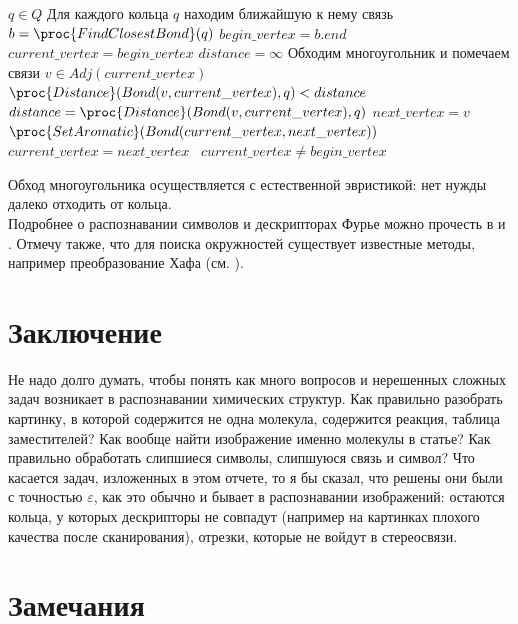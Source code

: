\begin{codebox}
  \li \For $q \in Q$
  \li \Comment Для каждого кольца $q$ находим ближайшую к нему связь
  \li \Do $b = \proc{FindClosestBond}(q)$
  \li $begin\_vertex = b.end$
  \li $current\_vertex = begin\_vertex$
  \li $distance = \infty$
  \li \Comment Обходим многоугольник и помечаем связи 
  \li \Repeat 
  \li \For $v \in Adj(current\_vertex)$
  \li \Do \If $\proc{Distance}(Bond(v,current\_vertex), q) < distance $
  \li \Then $distance = \proc{Distance}(Bond(v,current\_vertex), q)$ 
  \li $next\_vertex = v $ \End \End
  \li $\proc{SetAromatic}(Bond(current\_vertex, next\_vertex))$
  \li $current\_vertex = next\_vertex$ \
  \li \Until $current\_vertex \ne begin\_vertex$
\end{codebox}

\noindent
Обход многоугольника осуществляется с естественной эвристикой: нет нужды далеко отходить от кольца. \\ 
\noindent
Подробнее о распознавании символов
и дескрипторах Фурье можно прочесть в \cite{smolov} и \cite{zahn}. Отмечу также, что для поиска окружностей существует известные методы, 
например преобразование Хафа (см. \cite{gonzalez}). %


\section{Заключение}
\label{sec:future}

Не надо долго думать, чтобы понять как много вопросов и нерешенных сложных задач возникает в распознавании химических структур. Как
правильно разобрать картинку, в которой содержится не одна молекула, содержится реакция, таблица заместителей? Как вообще
найти изображение именно молекулы в статье? Как правильно обработать слипшиеся символы, слипшуюся связь и символ? Что касается задач, изложенных
в этом отчете, то я бы сказал, что решены они были с точностью $\varepsilon$, как это обычно и бывает в распознавании изображений: остаются
кольца, у которых дескрипторы не совпадут (например на картинках плохого качества после сканирования), отрезки, которые не войдут в стереосвязи.

\section{Замечания}

